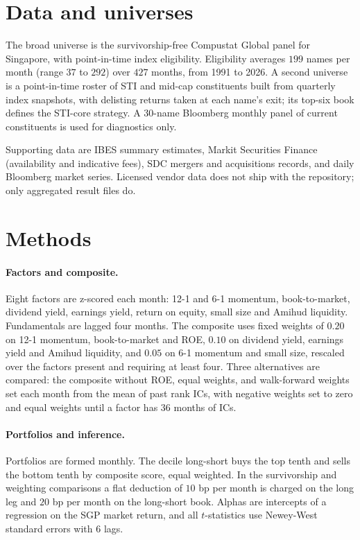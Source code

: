 \documentclass[11pt,a4paper]{article}
\begin{document}
\section{Data and universes}
The broad universe is the survivorship-free Compustat Global panel for Singapore, with point-in-time index eligibility. Eligibility averages $199$ names per month (range $37$ to $292$) over $427$ months, from 1991 to 2026. A second universe is a point-in-time roster of STI and mid-cap constituents built from quarterly index snapshots, with delisting returns taken at each name's exit; its top-six book defines the STI-core strategy. A 30-name Bloomberg monthly panel of current constituents is used for diagnostics only.

Supporting data are IBES summary estimates, Markit Securities Finance (availability and indicative fees), SDC mergers and acquisitions records, and daily Bloomberg market series. Licensed vendor data does not ship with the repository; only aggregated result files do.

\section{Methods}
\paragraph{Factors and composite.} Eight factors are z-scored each month: 12-1 and 6-1 momentum, book-to-market, dividend yield, earnings yield, return on equity, small size and Amihud liquidity. Fundamentals are lagged four months. The composite uses fixed weights of $0.20$ on 12-1 momentum, book-to-market and ROE, $0.10$ on dividend yield, earnings yield and Amihud liquidity, and $0.05$ on 6-1 momentum and small size, rescaled over the factors present and requiring at least four. Three alternatives are compared: the composite without ROE, equal weights, and walk-forward weights set each month from the mean of past rank ICs, with negative weights set to zero and equal weights until a factor has $36$ months of ICs.

\paragraph{Portfolios and inference.} Portfolios are formed monthly. The decile long-short buys the top tenth and sells the bottom tenth by composite score, equal weighted. In the survivorship and weighting comparisons a flat deduction of $10$ bp per month is charged on the long leg and $20$ bp per month on the long-short book. Alphas are intercepts of a regression on the SGP market return, and all $t$-statistics use Newey-West standard errors with $6$ lags.
\end{document}
